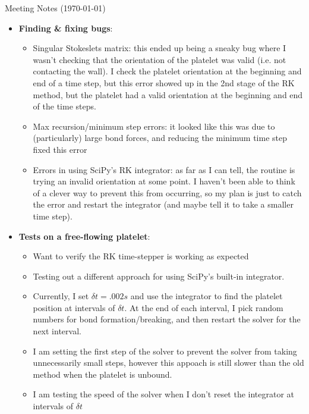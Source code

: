\documentclass{article}
\begin{document}
\pagestyle{plain}

\begin{center}
  {\Large Meeting Notes (\today)}
\end{center}

\begin{itemize}
\item \textbf{Finding \& fixing bugs}:
  \begin{itemize}
  \item Singular Stokeslets matrix: this ended up being a sneaky bug
    where I wasn't checking that the orientation of the platelet was
    valid (i.e. not contacting the wall). I check the platelet
    orientation at the beginning and end of a time step, but this
    error showed up in the 2nd stage of the RK method, but the
    platelet had a valid orientation at the beginning and end of the
    time steps.
  \item Max recursion/minimum step errors: it looked like this was due
    to (particularly) large bond forces, and reducing the minimum time
    step fixed this error
  \item Errors in using SciPy's RK integrator: as far as I can tell,
    the routine is trying an invalid orientation at some point. I
    haven't been able to think of a clever way to prevent this from
    occurring, so my plan is just to catch the error and restart the
    integrator (and maybe tell it to take a smaller time step).
  \end{itemize}
\item \textbf{Tests on a free-flowing platelet}:
  \begin{itemize}
  \item Want to verify the RK time-stepper is working as expected
  \item Testing out a different approach for using SciPy's built-in
    integrator. 
  \item Currently, I set $\delta t = .002 s$ and use the integrator to
    find the platelet position at intervals of $\delta t$. At the end
    of each interval, I pick random numbers for bond
    formation/breaking, and then restart the solver for the next
    interval. 
  \item I am setting the first step of the solver to prevent the
    solver from taking unnecessarily small steps, however this appoach
    is still slower than the old method when the platelet is unbound.
  \item I am testing the speed of the solver when I don't reset the
    integrator at intervals of $\delta t$

\end{itemize}
\end{itemize}
\end{document}
